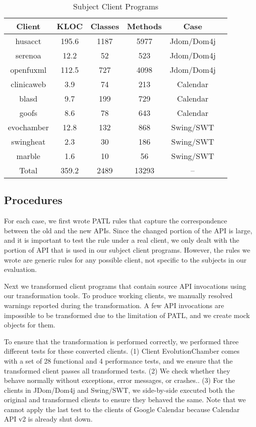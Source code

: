 \documentclass[a4paper, USenglish]{lipics-v2016}
\newcommand{\PATL}{PATL\xspace}
\theoremstyle{plain}
\begin{document}
\begin{table}
  \centering
  \caption{Subject Client Programs}
  \label{tbl:benchmark}
  \footnotesize
  \begin{tabular}{|c|c|c|c|c|c|}
    \hline
    Client & KLOC & Classes & Methods  & Case\\
    \hline \hline
    husacct & 195.6 & 1187  & 5977 & Jdom/Dom4j \\
    \hline
    serenoa & 12.2  & 52 & 523 & Jdom/Dom4j \\
    \hline
    openfuxml & 112.5 & 727 & 4098 & Jdom/Dom4j \\
    \hline
    clinicaweb & 3.9 & 74  & 213 & Calendar \\
    \hline
    blasd & 9.7 & 199 & 729 & Calendar  \\
    \hline
    goofs & 8.6 & 78 & 643 & Calendar  \\
    \hline
    evochamber & 12.8 & 132 & 868 & Swing/SWT \\
    \hline
    swingheat & 2.3 & 30 & 186 & Swing/SWT \\
    \hline
    marble & 1.6 & 10 & 56 & Swing/SWT \\
    \hline
    \hline
    Total & 359.2 & 2489 & 13293 & --\\
    \hline
  \end{tabular}
  \vspace{-10pt}
\end{table}

\subsection{Procedures}
For each case, we first wrote \PATL rules that capture the
correspondence between the old and the new APIs. Since the changed
portion of the API is large, and it is important to test the rule
under a real client, we only dealt with the portion of API that is
used in our subject client programs. However, the rules we wrote
are generic rules for any possible client, not specific to the
subjects in our evaluation.  


Next we transformed client programs that contain source API
invocations using our transformation tools. To produce working
clients, we manually resolved warnings reported during the
transformation. A few API invocations
are impossible to be transformed due to the limitation of \PATL, and we create mock objects for them.

To ensure that the transformation is performed correctly, we
performed three different
tests for these converted clients. (1) Client EvolutionChamber comes with a set
of 28 functional and 4 performance tests, and we ensure that the transformed client
passes all transformed tests. (2) We check whether they behave normally without exceptions, error messages, or crashes.. (3) For the clients in
JDom/Dom4j and Swing/SWT, we side-by-side executed both the original and transformed clients to ensure they behaved the same. Note that we cannot apply the last test to the clients
of Google Calendar because Calendar API v2 is already shut down.
\end{document}

